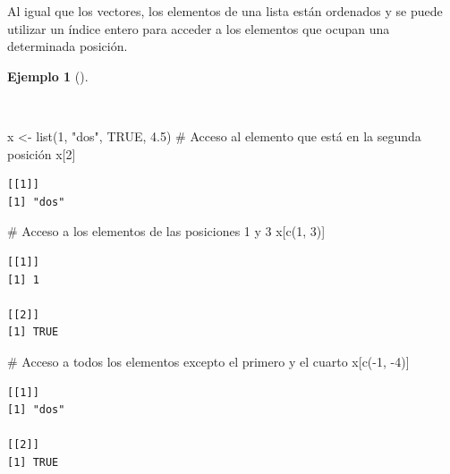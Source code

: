 \documentclass[
  spanish,
  a4paper,
]{scrreport}
\newenvironment{Shaded}{\begin{snugshade}}{\end{snugshade}}
\newcommand{\CommentTok}[1]{\textcolor[rgb]{0.37,0.37,0.37}{#1}}
\newcommand{\ConstantTok}[1]{\textcolor[rgb]{0.56,0.35,0.01}{#1}}
\newcommand{\DecValTok}[1]{\textcolor[rgb]{0.68,0.00,0.00}{#1}}
\newcommand{\FloatTok}[1]{\textcolor[rgb]{0.68,0.00,0.00}{#1}}
\newcommand{\FunctionTok}[1]{\textcolor[rgb]{0.28,0.35,0.67}{#1}}
\newcommand{\NormalTok}[1]{\textcolor[rgb]{0.00,0.23,0.31}{#1}}
\newcommand{\OtherTok}[1]{\textcolor[rgb]{0.00,0.23,0.31}{#1}}
\newcommand{\SpecialCharTok}[1]{\textcolor[rgb]{0.37,0.37,0.37}{#1}}
\newcommand{\StringTok}[1]{\textcolor[rgb]{0.13,0.47,0.30}{#1}}
\theoremstyle{definition}
\theoremstyle{definition}
\newtheorem{example}{Ejemplo}[chapter]
\theoremstyle{remark}
\begin{document}
Al igual que los vectores, los elementos de una lista están ordenados y
se puede utilizar un índice entero para acceder a los elementos que
ocupan una determinada posición.

\begin{example}[]\protect\hypertarget{exm-acceso-lista-indice-entero}{}\label{exm-acceso-lista-indice-entero}

~

\begin{Shaded}
\begin{Highlighting}[]
\NormalTok{x }\OtherTok{\textless{}{-}} \FunctionTok{list}\NormalTok{(}\DecValTok{1}\NormalTok{, }\StringTok{"dos"}\NormalTok{, }\ConstantTok{TRUE}\NormalTok{, }\FloatTok{4.5}\NormalTok{)}
\CommentTok{\# Acceso al elemento que está en la segunda posición}
\NormalTok{x[}\DecValTok{2}\NormalTok{]}
\end{Highlighting}
\end{Shaded}

\begin{verbatim}
[[1]]
[1] "dos"
\end{verbatim}

\begin{Shaded}
\begin{Highlighting}[]
\CommentTok{\# Acceso a los elementos de las posiciones 1 y 3}
\NormalTok{x[}\FunctionTok{c}\NormalTok{(}\DecValTok{1}\NormalTok{, }\DecValTok{3}\NormalTok{)]}
\end{Highlighting}
\end{Shaded}

\begin{verbatim}
[[1]]
[1] 1

[[2]]
[1] TRUE
\end{verbatim}

\begin{Shaded}
\begin{Highlighting}[]
\CommentTok{\# Acceso a todos los elementos excepto el primero y el cuarto}
\NormalTok{x[}\FunctionTok{c}\NormalTok{(}\SpecialCharTok{{-}}\DecValTok{1}\NormalTok{, }\SpecialCharTok{{-}}\DecValTok{4}\NormalTok{)]}
\end{Highlighting}
\end{Shaded}

\begin{verbatim}
[[1]]
[1] "dos"

[[2]]
[1] TRUE
\end{verbatim}

\end{example}
\end{document}
